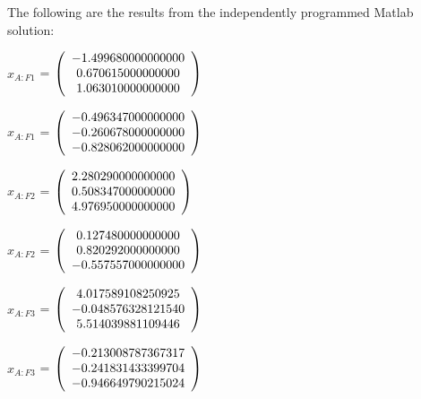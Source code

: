 \begin{description}
The following are the results from the independently programmed Matlab solution:

$x_{A:F1}$  = $\left( \begin{array} {ccc} -1.499680000000000 \\ 0.670615000000000 \\ 1.063010000000000
\end{array} \right)\\ \\$

$\hat{x}_{A:F1}$  = $\left( \begin{array} {ccc} -0.496347000000000 \\ -0.260678000000000 \\ -0.828062000000000
\end{array} \right)\\ \\$

$x_{A:F2}$  = $\left( \begin{array} {ccc} 2.280290000000000 \\ 0.508347000000000 \\ 4.976950000000000
\end{array} \right)\\ \\$

$\hat{x}_{A:F2}$  = $\left( \begin{array} {ccc} 0.127480000000000 \\ 0.820292000000000 \\ -0.557557000000000
\end{array} \right)\\ \\$

$x_{A:F3}$  = $\left( \begin{array} {ccc} 4.017589108250925 \\ -0.048576328121540 \\ 5.514039881109446
\end{array} \right)\\ \\$

$\hat{x}_{A:F3}$  = $\left( \begin{array} {ccc} -0.213008787367317 \\ -0.241831433399704 \\ -0.946649790215024
\end{array} \right)\\ \\$


\end{description}
